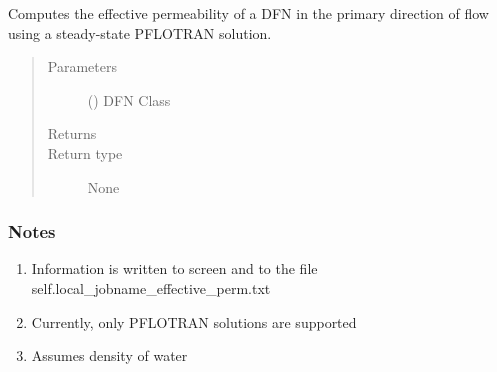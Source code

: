\documentclass[letterpaper,10pt,english]{sphinxmanual}
\begin{document}
\begin{fulllineitems}
\label{\detokenize{pydfnworks:pydfnworks.dfnFlow.mass_balance.effective_perm}}
Computes the effective permeability of a DFN in the primary direction of flow using a steady-state PFLOTRAN solution.
\begin{quote}\begin{description}
\item[{Parameters}] \leavevmode
{} () \textendash{} DFN Class

\item[{Returns}] \leavevmode


\item[{Return type}] \leavevmode
None

\end{description}\end{quote}
\subsubsection*{Notes}
\begin{enumerate}
\def\theenumi{\arabic{enumi}}
\def\labelenumi{\theenumi .}
\makeatletter\def\p@enumii{\p@enumi \theenumi .}\makeatother
\item {} 
Information is written to screen and to the file self.local\_jobname\_effective\_perm.txt

\item {} 
Currently, only PFLOTRAN solutions are supported

\item {} 
Assumes density of water

\end{enumerate}

\end{fulllineitems}

\end{document}
